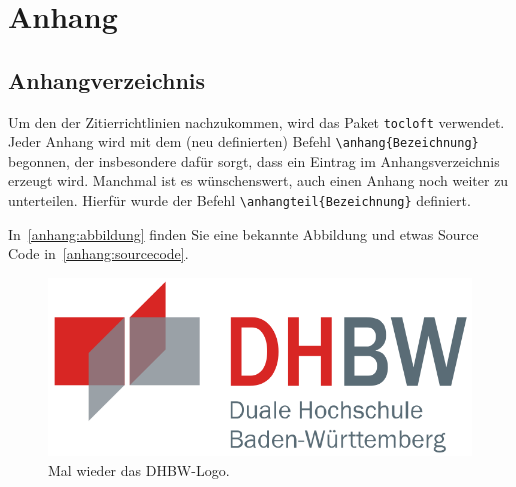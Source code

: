 \chapter*{Anhang}
\section*{Anhangverzeichnis}
\vspace{-8em}

\abstaendeanhangverzeichnis

\listofanhang
\clearpage
{} %




Um den  der Zitierrichtlinien nachzukommen, wird das Paket \verb|tocloft| verwendet. Jeder Anhang wird mit dem (neu definierten) Befehl \lstinline|\anhang{Bezeichnung}| begonnen, der insbesondere dafür sorgt, dass ein Eintrag im Anhangsverzeichnis erzeugt wird. Manchmal ist es wünschenswert, auch einen Anhang noch weiter zu unterteilen. Hierfür wurde der Befehl \lstinline|\anhangteil{Bezeichnung}| definiert.

In~\ref{anhang:abbildung} finden Sie eine bekannte Abbildung und etwas Source Code in~\ref{anhang:sourcecode}. 

\label{anhang:abbildung}
\begin{figure}[htb]
\centering
\includegraphics[width=0.9\linewidth]{graphics/dhbw.png}
\caption{Mal wieder das DHBW-Logo.}
\end{figure}

\label{anhang:sourcecode}


